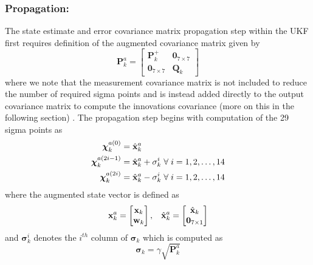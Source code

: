 \documentclass[letterpaper, paper,11pt]{AAS}		%
\begin{document}
\subsubsection{Propagation:}
The state estimate and error covariance matrix propagation step within the UKF first requires definition of the augmented covariance matrix given by 
\begin{equation}
	\mathbf{P}_k^a = \begin{bmatrix}
		\mathbf{P}_k^+ & \mathbf{0}_{7\times 7} \\
		\mathbf{0}_{7\times 7} & \mathbf{Q}_k
	\end{bmatrix}
\end{equation}
where we note that the measurement covariance matrix is not included to reduce the number of required sigma points and is instead added directly to the output covariance matrix to compute the innovations covariance (more on this in the following section) \cite{Crassidis_2004}. The propagation step begins with computation of the 29 sigma points as \cite{Crassidis_2004}
\begin{align}
	\boldsymbol{\chi}_k^{a(0)} &= \hat{\mathbf{x}}_k^a \\
	\boldsymbol{\chi}_k^{a(2i - 1)}  &=  \hat{\mathbf{x}}_k^a + \boldmath{\sigma}_k^i \hspace{1mm} \forall \hspace{1mm} i = 1,2,\dots,14 \\
	\boldsymbol{\chi}_k^{a(2i)}  &=  \hat{\mathbf{x}}_k^a - \boldmath{\sigma}_k^i \hspace{1mm} \forall \hspace{1mm} i = 1,2,\dots,14
\end{align}
where the augmented state vector is defined as \cite{Crassidis_2004}
\begin{align}
	\mathbf{x}_k^a = \begin{bmatrix}
		\mathbf{x}_k \\ \mathbf{w}_k
	\end{bmatrix}, \hspace{3mm} \hat{\mathbf{x}}_k^a = \begin{bmatrix}
		\hat{\mathbf{x}}_k \\ \mathbf{0}_{7\times 1}
\end{bmatrix}
\end{align}
and $\boldsymbol{\sigma}_k^i$ denotes the $i^{th}$ column of $\boldsymbol{\sigma}_k$ which is computed as
\begin{equation}
	\boldsymbol{\sigma}_k = \gamma \sqrt{\mathbf{P}_k^a}
\end{equation} 
\end{document}
